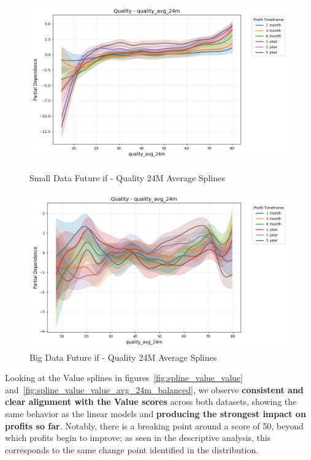 \documentclass[11pt,english,a4paper,hidelinks]{book}
\begin{document}
\begin{figure}[H]
    \centering
    \begin{minipage}{0.48\textwidth}
        \centering
        \includegraphics[width=\textwidth]{images/code/models/general_regression/splines/2D/Small Data future - IF/quality_quality_avg_24m.png}
        \caption{Small Data Future \acrshort{if} - Quality 24M Average Splines}
        \label{fig:spline_quality_quality_avg_24m}
    \end{minipage}\hfill
    \begin{minipage}{0.48\textwidth}
        \centering
        \includegraphics[width=\textwidth]{images/code/models/general_regression/splines/2D/Big Data future - IF HARD Balanced/quality_quality_avg_24m.png}
        \caption{Big Data Future \acrshort{if} - Quality 24M Average Splines}
        \label{fig:spline_quality_quality_avg_24m_balanced}
    \end{minipage}
\end{figure}

\noindent Looking at the Value splines in figures~\ref{fig:spline_value_value} and~\ref{fig:spline_value_value_avg_24m_balanced}, we observe \textbf{consistent and clear alignment with the Value scores} across both datasets, showing the same behavior as the linear models and \textbf{producing the strongest impact on profits so far}. Notably, there is a breaking point around a score of 50, beyond which profits begin to improve; as seen in the descriptive analysis, this corresponds to the same change point identified in the distribution.
\end{document}
